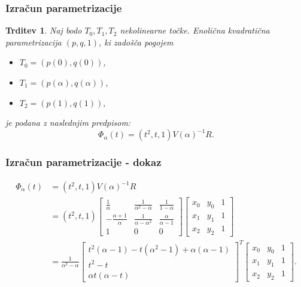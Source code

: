 \documentclass{beamer}
\newcommand{\al}{\alpha}
\newtheorem{trditev}{Trditev}
\begin{document}
\begin{frame}

\frametitle{Izračun parametrizacije}

\begin{trditev}\label{parametrizacija}
Naj bodo $T_0, T_1, T_2$  nekolinearne točke. Enolična kvadratična parametrizacija $(p, q, 1)$, ki zadošča pogojem
\begin{itemize}
\item $T_0 = (p(0), q(0))$,
\item $T_1 = (p(\al), q(\al))$, 
\item $T_2 = (p(1), q(1)),$
\end{itemize} 
je podana z naslednjim predpisom:
$$ \Phi_\al(t) = (t^2, t, 1) V(\al)^{-1} R.$$

\end{trditev}

\end{frame}


\begin{frame}

\frametitle{Izračun parametrizacije - dokaz}

\begin{align*}
\Phi_\al(t) &=  (t^2, t, 1) V(\al)^{-1} R \\
				&=  (t^2, t, 1)  
\begin{bmatrix}
\frac{1}{\al} & \frac{1}{\al^2 - \al} & \frac{1}{1-\al} \\
- \frac{\al + 1}{\al} & \frac{1}{\al - \al^2} & \frac{\al}{\al-1} \\
1 & 0 & 0
\end{bmatrix}
\begin{bmatrix}
x_0 & y_0 & 1 \\
x_1 & y_1 & 1 \\
x_2 & y_2 & 1 
\end{bmatrix}
\\
				&= \frac{1}{\al^2 - \al} 
\begin{bmatrix}
t^2(\al - 1) - t(\al^2 - 1) + \al(\al - 1) \\
 t^2 - t \\
\al t(\al - t)
\end{bmatrix}
^T
\begin{bmatrix}
x_0 & y_0 & 1 \\
x_1 & y_1 & 1 \\
x_2 & y_2 & 1 
\end{bmatrix}
.\\
\end{align*}


\end{frame}
\end{document}
